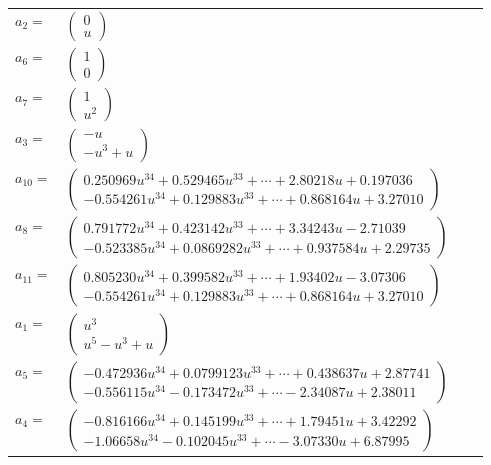 \documentclass[1p]{elsarticle_modified}
\theoremstyle{definition}
\begin{document}
\begin{tabular}{m{7pt} m{180pt} m{7pt} m{180pt} }
\flushright $a_{2}=$&$\begin{pmatrix}0\\u\end{pmatrix}$ \\
\flushright $a_{6}=$&$\begin{pmatrix}1\\0\end{pmatrix}$ \\
\flushright $a_{7}=$&$\begin{pmatrix}1\\u^2\end{pmatrix}$ \\
\flushright $a_{3}=$&$\begin{pmatrix}- u\\- u^3+u\end{pmatrix}$ \\
\flushright $a_{10}=$&$\begin{pmatrix}0.250969 u^{34}+0.529465 u^{33}+\cdots+2.80218 u+0.197036\\-0.554261 u^{34}+0.129883 u^{33}+\cdots+0.868164 u+3.27010\end{pmatrix}$ \\
\flushright $a_{8}=$&$\begin{pmatrix}0.791772 u^{34}+0.423142 u^{33}+\cdots+3.34243 u-2.71039\\-0.523385 u^{34}+0.0869282 u^{33}+\cdots+0.937584 u+2.29735\end{pmatrix}$ \\
\flushright $a_{11}=$&$\begin{pmatrix}0.805230 u^{34}+0.399582 u^{33}+\cdots+1.93402 u-3.07306\\-0.554261 u^{34}+0.129883 u^{33}+\cdots+0.868164 u+3.27010\end{pmatrix}$ \\
\flushright $a_{1}=$&$\begin{pmatrix}u^3\\u^5- u^3+u\end{pmatrix}$ \\
\flushright $a_{5}=$&$\begin{pmatrix}-0.472936 u^{34}+0.0799123 u^{33}+\cdots+0.438637 u+2.87741\\-0.556115 u^{34}-0.173472 u^{33}+\cdots-2.34087 u+2.38011\end{pmatrix}$ \\
\flushright $a_{4}=$&$\begin{pmatrix}-0.816166 u^{34}+0.145199 u^{33}+\cdots+1.79451 u+3.42292\\-1.06658 u^{34}-0.102045 u^{33}+\cdots-3.07330 u+6.87995\end{pmatrix}$ \\

\end{tabular}
\end{document}
